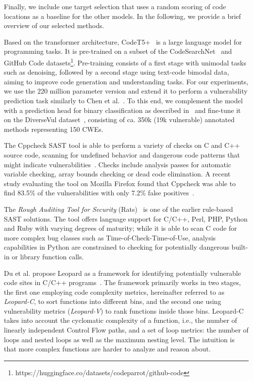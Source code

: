 Finally, we include one target selection that uses a random scoring of code locations as a baseline for the other models.
In the following, we provide a brief overview of our selected methods.

Based on the transformer architecture, CodeT5+~\cite{wang2023codet5plus} is a large language model for programming tasks. It is pre-trained on a subset of the CodeSearchNet~\cite{codesearchnet} and GitHub Code datasets\footnote{https://huggingface.co/datasets/codeparrot/github-code}.
%
Pre-training consists of a first stage with unimodal tasks such as denoising, followed by a second stage using text-code bimodal data,  aiming to improve code generation and understanding tasks. For our experiments, we use the 220 million parameter version and extend it to perform  a vulnerability prediction task similarly to Chen et al.~\cite{CheDinAloChe+23}. To this end, we complement the model with a prediction head for binary classification as described in~\cite{brokenPromises} and fine-tune it on the DiverseVul dataset~\cite{CheDinAloChe+23}, consisting of ca. 350k (19k vulnerable) annotated methods representing 150 CWEs.

The Cppcheck SAST tool is able to perform a variety of checks on C and C++ source code, scanning for undefined behavior and dangerous code patterns that might indicate vulnerabilities~\cite{cppcheck}. 
Checks include analysis passes for automatic variable checking, array bounds checking or dead code elimination.  
A recent study evaluating the tool on Mozilla Firefox found that Cppcheck was able to find 83.5\%  of the vulnerabilities with only 7.2\% false positives~\cite{cppcheckStudy}.

The \textit{Rough Auditing Tool for Security} (Rats)~\cite{rats} is one of the earlier rule-based SAST solutions. The tool offers language support for C/C++, Perl, PHP, Python and Ruby with varying degrees of maturity; while it is able to scan C code for more complex bug classes such as Time-of-Check-Time-of-Use,  analysis capabilities in Python are constrained to checking for potentially dangerous built-in or library function calls. 

Du et al. propose Leopard as a framework for identifying potentially vulnerable code sites in C/C++ programs~\cite{DuCheLiGuo+19}.
The framework primarily works in two stages, the first one employing code complexity metrics, hereinafter referred to as \textit{Leopard-C}, to sort functions into different bins, and the second one using vulnerability metrics (\textit{Leopard-V}) to rank functions inside those bins. 
Leopard-C takes into account the cyclomatic complexity of a function, i.e., the number of linearly independent Control Flow paths, and a set of loop metrics: the number of loops and nested loops as well as the maximum nesting level.
The intuition is that more complex functions are harder to analyze and reason about.

